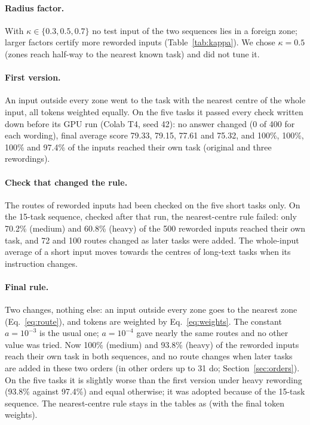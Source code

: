 \paragraph{Radius factor.} With $\kappa \in \{0.3, 0.5, 0.7\}$ no test input of the two sequences lies in a foreign zone; larger factors certify more reworded inputs (Table~\ref{tab:kappa}). We chose $\kappa = 0.5$ (zones reach half-way to the nearest known task) and did not tune it.

\begin{table}[h]
  \caption{Routes for three radius factors (CPU, T5-base word-vectors, final rule), for the original / light / medium / heavy wording.}
  \label{tab:kappa}
  \centering
  \footnotesize
  \setlength{\tabcolsep}{4pt}
  
\end{table}

\paragraph{First version.} An input outside every zone went to the task with the nearest centre of the whole input, all tokens weighted equally. On the five tasks it passed every check written down before its GPU run (Colab T4, seed 42): no answer changed (0 of 400 for each wording), final average score 79.33, 79.15, 77.61 and 75.32, and 100\%, 100\%, 100\% and 97.4\% of the inputs reached their own task (original and three rewordings).

\paragraph{Check that changed the rule.} The routes of reworded inputs had been checked on the five short tasks only. On the 15-task sequence, checked after that run, the nearest-centre rule failed: only 70.2\% (medium) and 60.8\% (heavy) of the 500 reworded inputs reached their own task, and 72 and 100 routes changed as later tasks were added. The whole-input average of a short input moves towards the centres of long-text tasks when its instruction changes.

\paragraph{Final rule.} Two changes, nothing else: an input outside every zone goes to the nearest zone (Eq.~\ref{eq:route}), and tokens are weighted by Eq.~\eqref{eq:weights}. The constant $a=10^{-3}$ is the usual one; $a = 10^{-4}$ gave nearly the same routes and no other value was tried. Now 100\% (medium) and 93.8\% (heavy) of the reworded inputs reach their own task in both sequences, and no route changes when later tasks are added in these two orders (in other orders up to 31 do; Section~\ref{sec:orders}). On the five tasks it is slightly worse than the first version under heavy rewording (93.8\% against 97.4\%) and equal otherwise; it was adopted because of the 15-task sequence. The nearest-centre rule stays in the tables as \centre{} (with the final token weights).

